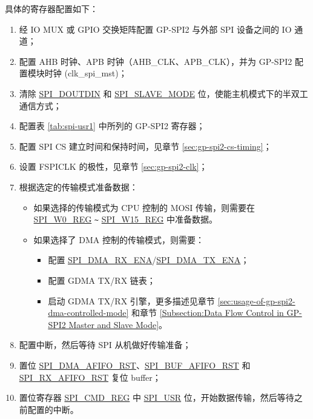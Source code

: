 \documentclass[main\_\_CN.tex]{subfiles}
\begin{document}
具体的寄存器配置如下：
\begin{enumerate}
    \item 经 IO MUX 或 GPIO 交换矩阵配置 GP-SPI2 与外部 SPI 设备之间的 IO 通道；
    \item 配置 AHB 时钟、APB 时钟（AHB\_CLK、APB\_CLK），并为 GP-SPI2 配置模块时钟 (clk\_spi\_mst)；

    \item 清除 \hyperref[fielddesc:SPIDOUTDIN]{SPI\_DOUTDIN} 和 \hyperref[fielddesc:SPISLAVEMODE]{SPI\_SLAVE\_MODE} 位，使能主机模式下的半双工通信方式；

    \item 配置表 \ref{tab:spi-usr1} 中所列的 GP-SPI2 寄存器；

    \item 配置 SPI CS 建立时间和保持时间，见章节  \ref{sec:gp-spi2-cs-timing}；

    \item 设置 FSPICLK 的极性，见章节  \ref{sec:gp-spi2-clk}；

    \item 根据选定的传输模式准备数据：
    \begin{itemize}
        \item 如果选择的传输模式为 CPU 控制的 MOSI 传输，则需要在 \hyperref[regdesc:SPIW0REG]{SPI\_W0\_REG} \verb+~+ \hyperref[regdesc:SPIW15REG]{SPI\_W15\_REG} 中准备数据。

        \item 如果选择了 DMA 控制的传输模式，则需要：
        \begin{itemize}
            \item 配置 \hyperref[fielddesc:SPIDMARXENA]{SPI\_DMA\_RX\_ENA}/\hyperref[fielddesc:SPIDMATXENA]{SPI\_DMA\_TX\_ENA}；
            \item 配置 GDMA TX/RX 链表；
            \item 启动 GDMA TX/RX 引擎，更多描述见章节  \ref{sec:usage-of-gp-spi2-dma-controlled-mode} 和章节  \ref{Subsection:Data Flow Control in GP-SPI2 Master and Slave Mode}。
        \end{itemize}
    \end{itemize}

    \item 配置中断，然后等待 SPI 从机做好传输准备；

    \item 置位 \hyperref[fielddesc:SPIDMAAFIFORST]{SPI\_DMA\_AFIFO\_RST}、\hyperref[fielddesc:SPIBUFAFIFORST]{SPI\_BUF\_AFIFO\_RST} 和 \hyperref[fielddesc:SPIRXAFIFORST]{SPI\_RX\_AFIFO\_RST} 复位 buffer；

    \item 置位寄存器 \hyperref[regdesc:SPICMDREG]{SPI\_CMD\_REG} 中 \hyperref[fielddesc:SPIUSR]{SPI\_USR} 位，开始数据传输，然后等待之前配置的中断。
\end{enumerate}
\end{document}
